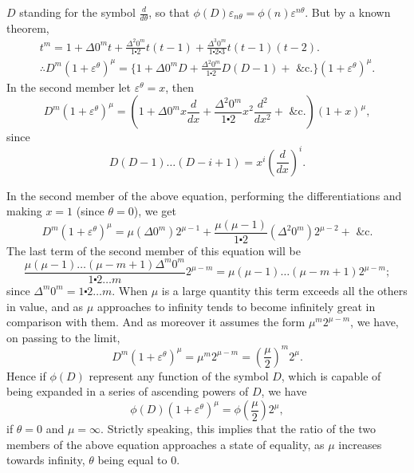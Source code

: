 \documentclass[oneside]{book}
\begin{document}
$D$ standing for the symbol $\frac{d}{d\theta}$, so that
$\phi(D) \varepsilon_{n\theta} = \phi(n) \varepsilon^{n\theta}$.
But by a known theorem,
\begin{gather*}
  t^m = 1 + \Delta 0^m t + \frac{\Delta^2 0^m}{1\centerdot 2} t(t-1)
      + \frac{\Delta^3 0^m}{1\centerdot 2\centerdot 3} t(t-1)(t-2).%
\\
  \therefore D^m (1+\varepsilon^\theta)^\mu
= \{1 + \Delta 0^mD + \frac{\Delta^2 0^m}{1\centerdot 2} D(D-1)
    + \text{ \&c.}\} (1+\varepsilon^\theta)^\mu.                   %
\end{gather*}
In the second member let $\varepsilon^\theta = x$, then
\[
  D^m (1+\varepsilon^\theta)^\mu
= (1 + \Delta 0^m x\frac{d}{dx}
    + \frac{\Delta^2 0^m}{1\centerdot 2} x^2 \frac{d^2}{dx^2}
    + \text{ \&c.}) (1+x)^\mu,                                     %
\]
since
\[
  D(D-1) \dotsc (D-i+1) = x^i \left( \frac{d}{dx} \right)^i.
\]

%
In the second member of the above equation, performing the differentiations
and making $x=1$ (since $\theta = 0$), we get
\[
  D^m(1 + \varepsilon^\theta)^\mu
= \mu(\Delta 0^m)2^{\mu-1}
  + \frac{\mu(\mu-1)}{1\centerdot 2}(\Delta^2 0^m)2^{\mu-2}
  + \text{ \&c.}
\]
The last term of the second member of this equation will be
\[
  \frac{\mu(\mu-1)\dotsc (\mu-m+1)\Delta^m 0^m}
       {1\centerdot 2\dotsc m}
  2^{\mu-m}
= \mu(\mu-1)\dotsc (\mu-m+1)2^{\mu-m};
\]
since $\Delta^m 0^m = 1\centerdot 2\dotsc m$. When $\mu$ is a large quantity this term
exceeds all the others in value, and as $\mu$ approaches to infinity
tends to become infinitely great in comparison with them. And
as moreover it assumes the form $\mu^m 2^{\mu-m}$, we have, on passing to
the limit,
\[
  D^m(1 + \varepsilon^\theta)^\mu = \mu^m 2^{\mu-m}
= \left( \frac{\mu}{2} \right)^m 2^\mu.
\]
Hence if $\phi(D)$ represent any function of the symbol $D$, which
is capable of being expanded in a series of ascending powers of $D$,
we have
\[
  \phi(D)(1 + \varepsilon^\theta)^\mu = \phi\left(\frac{\mu}{2}\right)2^\mu ,  \tag{4}
\]
if $\theta = 0$ and $\mu = \infty$. Strictly speaking, this implies that the ratio of
the two members of the above equation approaches a state of
equality, as $\mu$ increases towards infinity, $\theta$ being equal to $0$.
\end{document}

